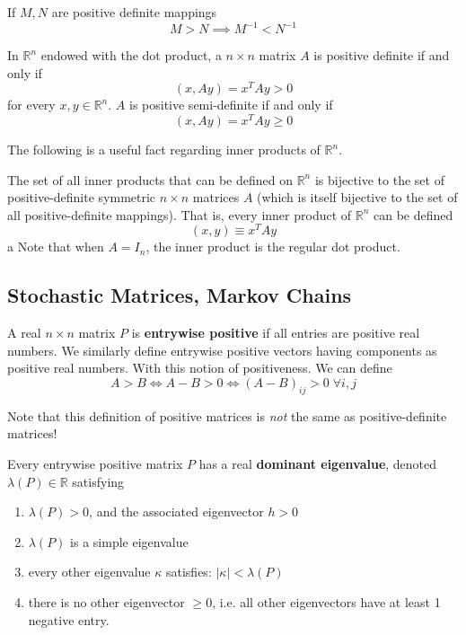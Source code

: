   \begin{theorem}
  If $M, N$ are positive definite mappings 
  \[ M > N \implies M^{-1} < N^{-1}\]
  \end{theorem}

  \begin{proposition}
  In $\mathbb{R}^n$ endowed with the dot product, a $n \times n$ matrix $A$ is positive definite if and only if 
  \[(x, A y) = x^T A y > 0 \]
  for every $x, y \in \mathbb{R}^n$. $A$ is positive semi-definite if and only if 
  \[(x, A y) = x^T A y \geq 0\]
  \end{proposition}

  The following is a useful fact regarding inner products of $\mathbb{R}^n$. 
  \begin{proposition}
  The set of all inner products that can be defined on $\mathbb{R}^n$ is bijective to the set of positive-definite symmetric $n \times n$ matrices $A$ (which is itself bijective to the set of all positive-definite mappings). That is, every inner product of $\mathbb{R}^n$ can be defined 
  \[(x, y) \equiv x^T A y\]a
  Note that when $A = I_n$, the inner product is the regular dot product.
  \end{proposition}

\subsection{Stochastic Matrices, Markov Chains}

  \begin{definition}
  A real $n \times n$ matrix $P$ is \textbf{entrywise positive} if all entries are positive real numbers. We similarly define entrywise positive vectors having components as positive real numbers. With this notion of positiveness. We can define
  \[A > B \iff A - B > 0 \iff (A-B)_{i j} > 0 \; \forall i, j\]
  \end{definition}

  Note that this definition of positive matrices is \textit{not} the same as positive-definite matrices! 

  \begin{theorem}
  Every entrywise positive matrix $P$ has a real \textbf{dominant eigenvalue}, denoted $\lambda(P) \in \mathbb{R}$ satisfying
  \begin{enumerate}
      \item $\lambda(P) > 0$, and the associated eigenvector $h >0$
      \item $\lambda(P)$ is a simple eigenvalue
      \item every other eigenvalue $\kappa$ satisfies: $|\kappa| < \lambda(P)$
      \item there is no other eigenvector $\geq 0$, i.e. all other eigenvectors have at least 1 negative entry.
  \end{enumerate}
  \end{theorem}

